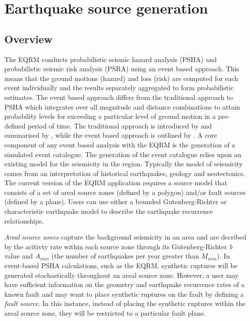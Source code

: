 \chapter{Earthquake source generation}
\label{ch:source}

\section{Overview}

The EQRM conducts probabilistic seismic hazard analysis (PSHA) and
probabilistic seismic risk analysis (PSRA) using an event based
approach. This means that the ground motions (hazard) and loss
(risk) are computed for each event individually and the results
separately aggregated to form probabilistic estimates. The event
based approach differs from the traditional approach to PSHA which
integrates over all magnitude and distance combinations to attain
probability levels for exceeding a particular level of ground
motion in a pre-defined period of time. The traditional approach
is introduced by \citet{dr_Cornell68a} and summarised by
\citet{dr_McGuire90a}, while the event based approach is outlined by \citet{eqrm_Musson00}. A core component of any event based
analysis with the EQRM is the generation of a simulated
event  catalogue. The
generation of the event catalogue relies upon an existing model for
the seismicity in the region. Typically the  model of seismicity comes
 from an interpretation of historical earthquakes,
 geology and neotectonics. The current version of the EQRM application requires a source model
that consists of a set of areal source zones (defined by a polygon) and/or fault sources (defined by a plane). Users can use either a bounded Gutenberg-Richter 
or characteristic earthquake model \citep{eqrm_Schwartz84} 
to describe the earthquake recurrence relationships. 

\emph{Areal source zones} capture the background seismicity in an area and are decribed by the acitivty rate within
each source zone through its Gutenberg-Richter \emph{b} value and $A_{min}$ (the number of earthquakes per year greater than $M_{min}$). 
In event-based PSHA calculations, such as the EQRM,
synthetic ruptures will be generated stochastically throughout an areal source zone. However, a user may have sufficient information 
on the geometry and earthquake recurrence rates of a known fault and may want to place synthetic ruptures on the fault by defining a 
\emph{fault source}. In this instance, instead of placing the synthetic ruptures within the areal source zone, they will be restricted to a particular fault plane. 

